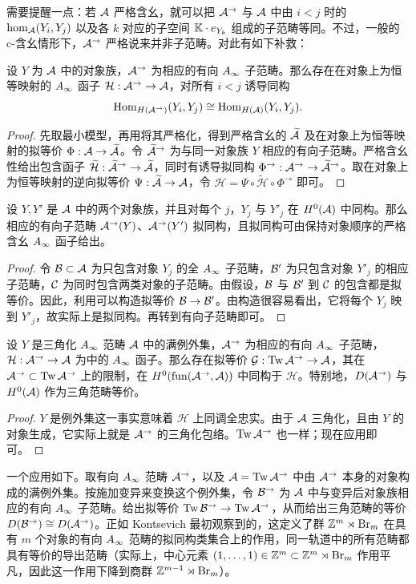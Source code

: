 需要提醒一点：若 $\mathcal A$ 严格含幺，就可以把 $\mathcal A^{\to}$ 与 $\mathcal A$ 中由 $i<j$ 时的 $\hom_{\mathcal A}(Y_i,Y_j)$ 以及各 $k$ 对应的子空间 $\mathbb K\cdot e_{Y_k}$ 组成的子范畴等同。不过，一般的 c-含幺情形下，$\mathcal A^{\to}$ 严格说来并非子范畴。对此有如下补救：
\begin{lemma}\label{st:5.20}
设 $Y$ 为 $\mathcal A$ 中的对象族，$\mathcal A^{\to}$ 为相应的有向 $A_\infty$ 子范畴。那么存在在对象上为恒等映射的 $A_\infty$ 函子 $\mathcal H:\mathcal A^{\to}\to\mathcal A$，对所有 $i<j$ 诱导同构
\[
\operatorname{Hom}_{H(\mathcal A^{\to})}(Y_i,Y_j)\cong\operatorname{Hom}_{H(\mathcal A)}(Y_i,Y_j).
\]
\end{lemma}
\begin{proof}
先取最小模型，再用将其严格化，得到严格含幺的 $\widetilde{\mathcal A}$ 及在对象上为恒等映射的拟等价 $\Phi:\mathcal A\to\widetilde{\mathcal A}$。令 $\widetilde{\mathcal A}^{\to}$ 为与同一对象族 $Y$ 相应的有向子范畴。严格含幺性给出包含函子 $\widetilde{\mathcal H}:\widetilde{\mathcal A}^{\to}\to\widetilde{\mathcal A}$，同时有诱导拟同构 $\Phi^{\to}:\mathcal A^{\to}\to\widetilde{\mathcal A}^{\to}$。取在对象上为恒等映射的逆向拟等价 $\Psi:\widetilde{\mathcal A}\to\mathcal A$，令 $\mathcal H=\Psi\circ\widetilde{\mathcal H}\circ\Phi^{\to}$ 即可。
\end{proof}
\begin{lemma}\label{st:5.21}
设 $Y,Y'$ 是 $\mathcal A$ 中的两个对象族，并且对每个 $j$，$Y_j$ 与 $Y'_j$ 在 $H^0(\mathcal A)$ 中同构。那么相应的有向子范畴 $\mathcal A^{\to}(Y)$、$\mathcal A^{\to}(Y')$ 拟同构，且拟同构可由保持对象顺序的严格含幺 $A_\infty$ 函子给出。
\end{lemma}
\begin{proof}
令 $\mathcal B\subset\mathcal A$ 为只包含对象 $Y_j$ 的全 $A_\infty$ 子范畴，$\mathcal B'$ 为只包含对象 $Y'_j$ 的相应子范畴，$\mathcal C$ 为同时包含两类对象的子范畴。由假设，$\mathcal B$ 与 $\mathcal B'$ 到 $\mathcal C$ 的包含都是拟等价。因此，利用可以构造拟等价 $\mathcal B\to\mathcal B'$。由构造很容易看出，它将每个 $Y_j$ 映到 $Y'_j$，故实际上是拟同构。再转到有向子范畴即可。
\end{proof}
\begin{lemma}\label{st:5.22}
设 $Y$ 是三角化 $A_\infty$ 范畴 $\mathcal A$ 中的满例外集，$\mathcal A^{\to}$ 为相应的有向 $A_\infty$ 子范畴，$\mathcal H:\mathcal A^{\to}\to\mathcal A$ 为中的
$A_\infty$ 函子。那么存在拟等价 $\mathcal G:\operatorname{Tw}\mathcal A^{\to}\to\mathcal A$，其在 $\mathcal A^{\to}\subset\operatorname{Tw}\mathcal A^{\to}$ 上的限制，在 $H^0(\operatorname{fun}(\mathcal A^{\to},\mathcal A))$ 中同构于 $\mathcal H$。特别地，$D(\mathcal A^{\to})$ 与 $H^0(\mathcal A)$ 作为三角范畴等价。
\end{lemma}
\begin{proof}
$Y$ 是例外集这一事实意味着 $\mathcal H$ 上同调全忠实。由于 $\mathcal A$ 三角化，且由 $Y$ 的对象生成，它实际上就是 $\mathcal A^{\to}$ 的三角化包络。$\operatorname{Tw}\mathcal A^{\to}$ 也一样；现在应用即可。
\end{proof}
一个应用如下。取有向 $A_\infty$ 范畴 $\mathcal A^{\to}$，以及 $\mathcal A=\operatorname{Tw}\mathcal A^{\to}$ 中由 $\mathcal A^{\to}$ 本身的对象构成的满例外集。按施加变异来变换这个例外集，令 $\mathcal B^{\to}$ 为 $\mathcal A$ 中与变异后对象族相应的有向 $A_\infty$ 子范畴。给出拟等价 $\operatorname{Tw}\mathcal B^{\to}\to\operatorname{Tw}\mathcal A^{\to}$，从而给出三角范畴的等价 $D(\mathcal B^{\to})\cong D(\mathcal A^{\to})$。正如 Kontsevich 最初观察到的，这定义了群 $\mathbb Z^m\rtimes\operatorname{Br}_m$ 在具有 $m$ 个对象的有向 $A_\infty$ 范畴的拟同构类集合上的作用，同一轨道中的所有范畴都具有等价的导出范畴（实际上，中心元素 $(1,\ldots,1)\in\mathbb Z^m\subset\mathbb Z^m\rtimes\operatorname{Br}_m$ 作用平凡，因此这一作用下降到商群 $\mathbb Z^{m-1}\rtimes\operatorname{Br}_m$）。

